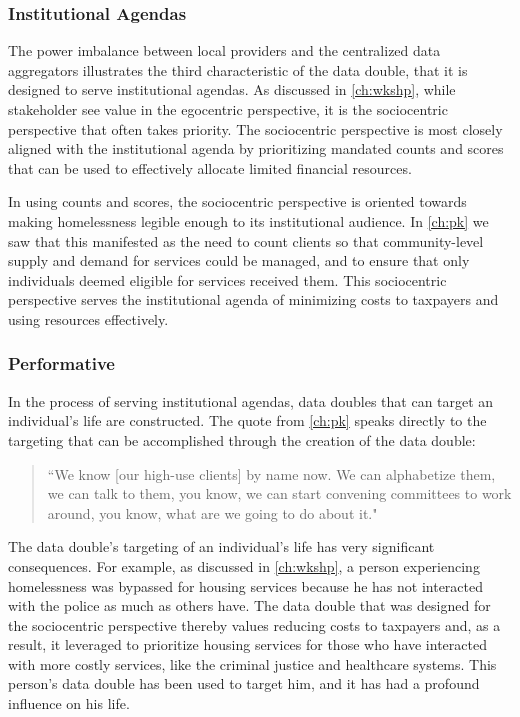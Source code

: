 \subsubsection{Institutional Agendas}
The power imbalance between local providers and the centralized data aggregators illustrates the third characteristic of the data double, that it is designed to serve institutional agendas. As discussed in \autoref{ch:wkshp}, while stakeholder see value in the egocentric perspective, it is the sociocentric perspective that often takes priority. The sociocentric perspective is most closely aligned with the institutional agenda by prioritizing mandated counts and scores that can be used to effectively allocate limited financial resources.

In using counts and scores, the sociocentric perspective is oriented towards making homelessness legible enough to its institutional audience. In \autoref{ch:pk} we saw that this manifested as the need to count clients so that community-level supply and demand for services could be managed, and to ensure that only individuals deemed eligible for services received them. This sociocentric perspective serves the institutional agenda of minimizing costs to taxpayers and using resources effectively.

\subsubsection{Performative}
In the process of serving institutional agendas, data doubles that can target an individual's life are constructed. The quote from \autoref{ch:pk} speaks directly to the targeting that can be accomplished through the creation of the data double:

\begin{quote}\singlespacing ``We know [our high-use clients] by name now. We can alphabetize them, we can talk to them, you know, we can start convening committees to work around, you know, what are we going to do about it." \end{quote}

The data double's targeting of an individual's life has very significant consequences. For example, as discussed in \autoref{ch:wkshp}, a person experiencing homelessness was bypassed for housing services because he has not interacted with the police as much as others have. The data double that was designed for the sociocentric perspective thereby values reducing costs to taxpayers and, as a result, it leveraged to prioritize housing services for those who have interacted with more costly services, like the criminal justice and healthcare systems. This person's data double has been used to target him, and it has had a profound influence on his life.

